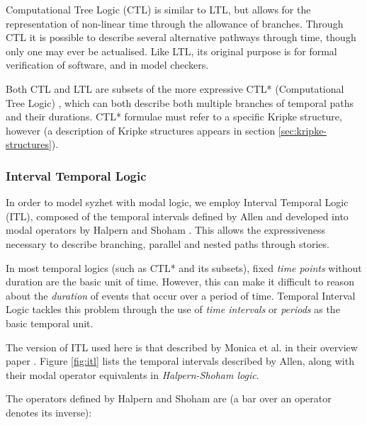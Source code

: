 \documentclass{llncs}
\begin{document}
Computational Tree Logic (CTL) \cite{ben1983temporal} is similar to LTL, but allows for the representation of non-linear time through the allowance of branches. Through CTL it is possible to describe several alternative pathways through time, though only one may ever be actualised. Like LTL, its original purpose is for formal verification of software, and in model checkers.

Both CTL and LTL are subsets of the more expressive CTL* (Computational Tree Logic) \cite{emerson1986sometimes}, which can both describe both multiple branches of temporal paths and their durations. CTL* formulae must refer to a specific Kripke structure, however (a description of Kripke structures appears in section \ref{sec:kripke-structures}).

\subsubsection{Interval Temporal Logic}
In order to model syzhet with modal logic, we employ Interval Temporal Logic (ITL), composed of the temporal intervals defined by Allen \cite{allen1983maintaining} and developed into modal operators by Halpern and Shoham \cite{halpern1991propositional}. This allows the expressiveness necessary to describe branching, parallel and nested paths through stories.

In most temporal logics (such as CTL* and its subsets), fixed \emph{time points} without duration are the basic unit of time. However, this can make it difficult to reason about the \emph{duration} of events that occur over a period of time. Temporal Interval Logic tackles this problem through the use of \emph{time intervals} or \emph{periods} as the basic temporal unit.

The version of ITL used here is that described by Monica et al. in their overview paper \cite{della2013interval}. Figure \ref{fig:itl} lists the temporal intervals described by Allen, along with their modal operator equivalents in \emph{Halpern-Shoham logic}.

The operators defined by Halpern and Shoham are (a bar over an operator denotes its inverse):
\end{document}
